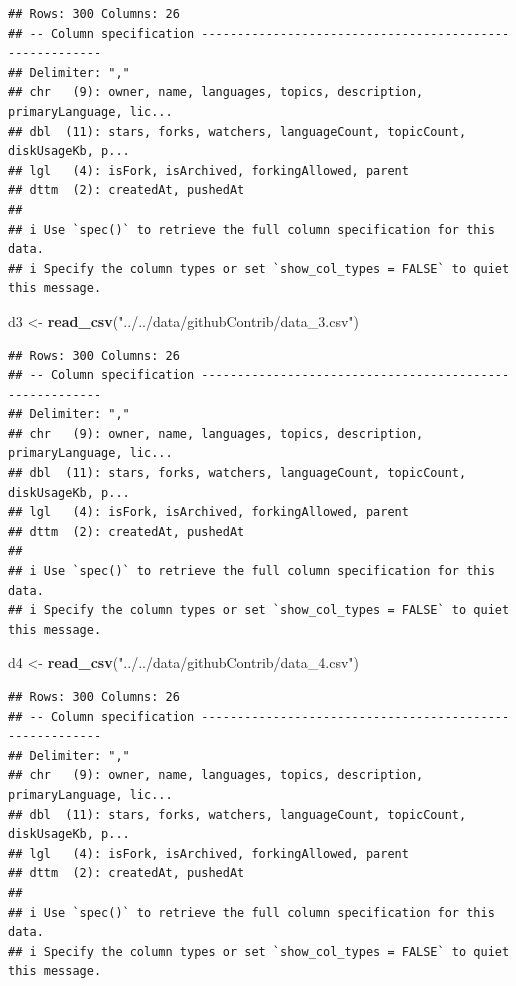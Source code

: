 \documentclass[
]{article}
\newenvironment{Shaded}{\begin{snugshade}}{\end{snugshade}}
\newcommand{\FunctionTok}[1]{\textcolor[rgb]{0.13,0.29,0.53}{\textbf{#1}}}
\newcommand{\NormalTok}[1]{#1}
\newcommand{\OtherTok}[1]{\textcolor[rgb]{0.56,0.35,0.01}{#1}}
\newcommand{\StringTok}[1]{\textcolor[rgb]{0.31,0.60,0.02}{#1}}
\begin{document}
\begin{verbatim}
## Rows: 300 Columns: 26
## -- Column specification --------------------------------------------------------
## Delimiter: ","
## chr   (9): owner, name, languages, topics, description, primaryLanguage, lic...
## dbl  (11): stars, forks, watchers, languageCount, topicCount, diskUsageKb, p...
## lgl   (4): isFork, isArchived, forkingAllowed, parent
## dttm  (2): createdAt, pushedAt
## 
## i Use `spec()` to retrieve the full column specification for this data.
## i Specify the column types or set `show_col_types = FALSE` to quiet this message.
\end{verbatim}

\begin{Shaded}
\begin{Highlighting}[]
\NormalTok{d3 }\OtherTok{\textless{}{-}} \FunctionTok{read\_csv}\NormalTok{(}\StringTok{"../../data/githubContrib/data\_3.csv"}\NormalTok{)}
\end{Highlighting}
\end{Shaded}

\begin{verbatim}
## Rows: 300 Columns: 26
## -- Column specification --------------------------------------------------------
## Delimiter: ","
## chr   (9): owner, name, languages, topics, description, primaryLanguage, lic...
## dbl  (11): stars, forks, watchers, languageCount, topicCount, diskUsageKb, p...
## lgl   (4): isFork, isArchived, forkingAllowed, parent
## dttm  (2): createdAt, pushedAt
## 
## i Use `spec()` to retrieve the full column specification for this data.
## i Specify the column types or set `show_col_types = FALSE` to quiet this message.
\end{verbatim}

\begin{Shaded}
\begin{Highlighting}[]
\NormalTok{d4 }\OtherTok{\textless{}{-}} \FunctionTok{read\_csv}\NormalTok{(}\StringTok{"../../data/githubContrib/data\_4.csv"}\NormalTok{)}
\end{Highlighting}
\end{Shaded}

\begin{verbatim}
## Rows: 300 Columns: 26
## -- Column specification --------------------------------------------------------
## Delimiter: ","
## chr   (9): owner, name, languages, topics, description, primaryLanguage, lic...
## dbl  (11): stars, forks, watchers, languageCount, topicCount, diskUsageKb, p...
## lgl   (4): isFork, isArchived, forkingAllowed, parent
## dttm  (2): createdAt, pushedAt
## 
## i Use `spec()` to retrieve the full column specification for this data.
## i Specify the column types or set `show_col_types = FALSE` to quiet this message.
\end{verbatim}
\end{document}

